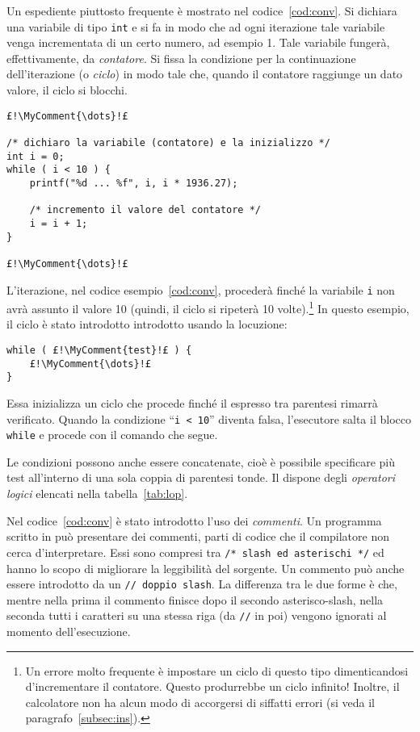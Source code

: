 Un espediente piuttosto frequente è mostrato nel codice~\vref{cod:conv}.
Si dichiara una variabile di tipo \lstinline!int! e si fa in modo che ad ogni iterazione tale variabile venga incrementata di un certo numero, ad esempio \num{1}.
Tale  variabile fungerà, effettivamente, da \emph{contatore}. Si fissa la condizione per la continuazione dell'iterazione (o \emph{ciclo}) in modo tale che, quando il contatore raggiunge un dato valore, il ciclo si blocchi.
\begin{lstlisting}[caption={{\em Tabella di conversione Euro/Lira.}}, label={cod:conv}]
£!\MyComment{\dots}!£

/* dichiaro la variabile (contatore) e la inizializzo */
int i = 0; 
while ( i < 10 ) {
	printf("%d ... %f", i, i * 1936.27);

	/* incremento il valore del contatore */
	i = i + 1; 
}

£!\MyComment{\dots}!£
\end{lstlisting}
L'iterazione, nel codice esempio~\ref{cod:conv}, procederà finché la variabile \lstinline!i! non avrà assunto il valore \num{10} (quindi, il ciclo si ripeterà \num{10} volte).\footnote{Un errore molto frequente è impostare un ciclo di questo tipo dimenticandosi d'incrementare il contatore. Questo produrrebbe un ciclo infinito! Inoltre, il calcolatore non ha alcun modo di accorgersi di siffatti errori (si veda il paragrafo~\ref{subsec:ins}).}
In questo esempio, il ciclo è stato introdotto introdotto usando la locuzione:
\begin{lstlisting}
while ( £!\MyComment{test}!£ ) {
	£!\MyComment{\dots}!£
}
\end{lstlisting}
Essa inizializza un ciclo che  procede finché il  espresso tra parentesi rimarrà verificato. Quando la condizione ``\lstinline!i < 10!'' diventa falsa, l'esecutore salta il blocco \lstinline!while! e procede con il comando che segue.

Le condizioni possono anche essere concatenate, cioè è possibile specificare più test all'interno di una sola coppia di parentesi tonde. Il  dispone degli \emph{operatori logici} elencati nella tabella~\ref{tab:lop}.


Nel codice~\ref{cod:conv} è stato introdotto l'uso dei \emph{commenti}.
Un programma scritto in  può presentare dei commenti, parti di codice che il compilatore non cerca d'interpretare.
Essi sono compresi tra \lstinline!/* slash ed asterischi */! ed hanno lo scopo di migliorare la leggibilità del sorgente.
Un commento può anche essere introdotto da un \lstinline!// doppio slash!.
La differenza tra le due forme è che, mentre nella prima il commento finisce dopo il secondo asterisco-slash, nella seconda tutti i caratteri su una stessa riga (da \lstinline!//! in poi) vengono ignorati al momento dell'esecuzione.


